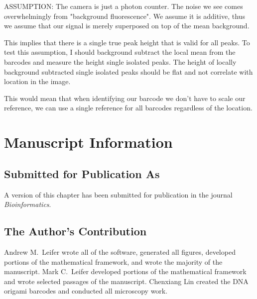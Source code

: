




ASSUMPTION: The camera is just a photon counter. The noise we see comes overwhelmingly from "background fluorescence". We assume it is additive, thus we assume that our signal is merely superposed on top of the mean background. 

This implies that there is a single true peak height that is valid for all peaks. To test this assumption, I should background subtract the local mean from the barcodes and measure the height single isolated peaks. The height of locally background subtracted single isolated peaks should be flat and not correlate with location in the image.

This would mean that when identifying our barcode we don't have to scale our reference, we can use a single reference for all barcodes regardless of the location.


\section{Manuscript Information}
\subsection{Submitted for Publication As}
A version of this chapter has been submitted for publication in the journal \textit{Bioinformatics}.

\subsection{The Author's Contribution}
Andrew M.~Leifer wrote all of the software, generated all figures, developed portions of the mathematical framework, and wrote the majority of the manuscript. Mark C.~Leifer developed portions of the mathematical framework and wrote selected passages of the manuscript. Chenxiang Lin created the DNA origami barcodes and conducted all microscopy work. 
 
